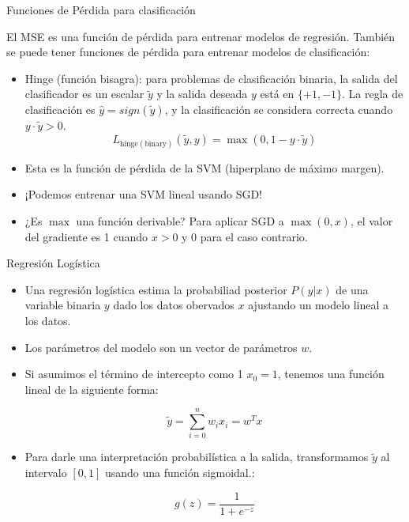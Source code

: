 \documentclass[handout]{beamer}
\begin{document}
\begin{frame}{Funciones de Pérdida para clasificación}
\begin{scriptsize}
El MSE es una función de pérdida para entrenar modelos de regresión. También se puede tener funciones de pérdida para entrenar modelos de clasificación:
\begin{itemize}
 \item Hinge (función bisagra): para problemas de clasificación binaria, la salida del clasificador es un escalar $\tilde{y}$ y la salida deseada $y$ está en $\{+1,-1\}$.  La regla de clasificación es $\hat{y} = sign(\tilde{y})$, y la clasificación se considera correcta cuando $y \cdot \tilde{y} > 0$.  
 \begin{displaymath}
  L_{\text{hinge}(\text{binary})}(\tilde{y},y) = \max(0,1-y \cdot \tilde{y})  
 \end{displaymath}
 
 \item Esta es la función de pérdida de la SVM (hiperplano de máximo margen). 
 
 \item ¡Podemos entrenar una SVM lineal usando SGD!
 
 \item ¿Es $\max$ una función derivable? Para aplicar SGD a $\max(0,x)$, el valor del gradiente es 1 cuando $x>0$ y 0 para el caso contrario.

 
\end{itemize}
\end{scriptsize}

\end{frame}



\begin{frame}{Regresión Logística}
\begin{scriptsize}
\begin{itemize}
\item Una regresión logística estima la probabiliad posterior  $P(y|x)$ de una variable binaria $y$ dado los datos obervados $x$ ajustando un modelo lineal a los datos.

\item Los parámetros del modelo son un vector de parámetros $w$.

\item Si asumimos el término de intercepto como 1 $x_0=1$, tenemos una función lineal de la siguiente forma:


\begin{equation}
 \tilde{y}=\sum_{i=0}^{n}w_{i}x_{i}=w^Tx
\end{equation}

\item Para darle una interpretación probabilística a la salida, transformamos $\tilde{y}$ al intervalo $[0,1]$ usando una función sigmoidal.:

\begin{equation}
g(z)=\frac{1}{1+e^{-z}}
\end{equation}
 
 
\end{itemize}
\end{scriptsize}

\end{frame}
\end{document}
